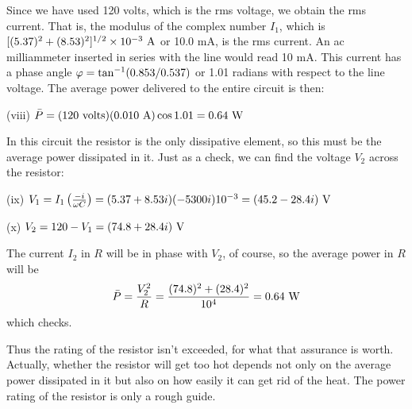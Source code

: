\noindent Since we have used 120 volts, which is the rms voltage, we obtain the
rms current. That is, the modulus of the complex number $I_1$, which
is $[(5.37)^2+(8.53)^2]^{1/2}\times10^{-3}\ \zu{A}$ or 10.0 mA,
is the rms current. An ac milliammeter inserted in series
with the line would read 10 mA. This current has a phase angle
$\varphi=\tan^{-1}(0.853/0.537)$ or 1.01 radians with respect to the line
voltage. The average power delivered to the entire circuit is then:

\vspace{3mm}
\noindent (viii) $\bar{P}=(120\ \text{volts})(0.010\ \zu{A})\cos1.01=0.64\ \zu{W}$
\vspace{3mm}

\noindent In this circuit the resistor is the only dissipative element, so this must
be the average power dissipated in it. Just as a check, we can find
the voltage $V_2$ across the resistor:

\vspace{3mm}
\noindent (ix) $V_1=I_1\left(\frac{-i}{\omega C}\right) = (5.37+8.53i)(-5300i)10^{-3}
        =(45.2-28.4i)\ \textup{V}$
\vspace{3mm}

\noindent (x) $V_2=120-V_1=(74.8+28.4i)\ \zu{V}$
\vspace{3mm}

\noindent The current $I_2$ in $R$ will be in phase with $V_2$, of course, so the average
power in $R$ will be
\begin{equation}
  \bar{P} = \frac{V_2^2}{R} = \frac{(74.8)^2+(28.4)^2}{10^4} = 0.64\ \textup{W}
\end{equation}
which checks.

Thus the rating of the resistor isn't exceeded, for what that
assurance is worth. Actually, whether the resistor will get too hot
depends not only on the average power dissipated in it but also on how
easily it can get rid of the heat. The power rating of the resistor is
only a rough guide.
